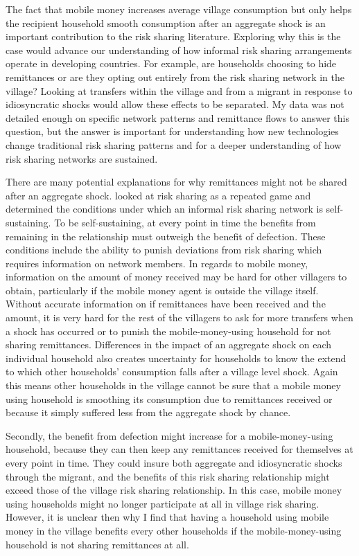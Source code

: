 The fact that mobile money increases average village consumption but only helps the recipient household smooth consumption after an aggregate shock is an important contribution to the risk sharing literature. Exploring why this is the case would advance our understanding of how informal risk sharing arrangements operate in developing countries. For example, are households choosing to hide remittances or are they opting out entirely from the risk sharing network in the village? Looking at transfers within the village and from a migrant in response to idiosyncratic shocks would allow these effects to be separated. My data was not detailed enough on specific network patterns and remittance flows to answer this question, but the answer is important for understanding how new technologies change traditional risk sharing patterns and for a deeper understanding of how risk sharing networks are sustained.  

There are many potential explanations for why remittances might not be shared after an aggregate shock. \cite{coate1993} looked at risk sharing as a repeated game and determined the conditions under which an informal risk sharing network is self-sustaining. To be self-sustaining, at every point in time the benefits from remaining in the relationship must outweigh the benefit of defection. These conditions include the ability to punish  deviations from risk sharing which requires information on network members. In regards to mobile money, information on the amount of money received may be hard for other villagers to obtain, particularly if the mobile money agent is outside the village itself. Without accurate information on if remittances have been received and the amount, it is very hard for the rest of the villagers to ask for more transfers when a shock has occurred or to punish the mobile-money-using household for not sharing remittances. Differences in the impact of an aggregate shock on each individual household also creates uncertainty for households to know the extend to which other households' consumption falls after a village level shock. Again this means other households in the village cannot be sure that a mobile money using household is smoothing its consumption due to remittances received or because it simply suffered less from the aggregate shock by chance. 

Secondly, the benefit from defection might increase for a mobile-money-using household, because they can then keep any remittances received for themselves at every point in time. They could insure both aggregate and idiosyncratic shocks through the migrant, and the benefits of this risk sharing relationship might exceed those of the village risk sharing relationship. In this case, mobile money using households might no longer participate at all in village risk sharing. However, it is unclear then why I find that having a household using mobile money in the village  benefits every other households if the mobile-money-using household is not sharing remittances at all.  


